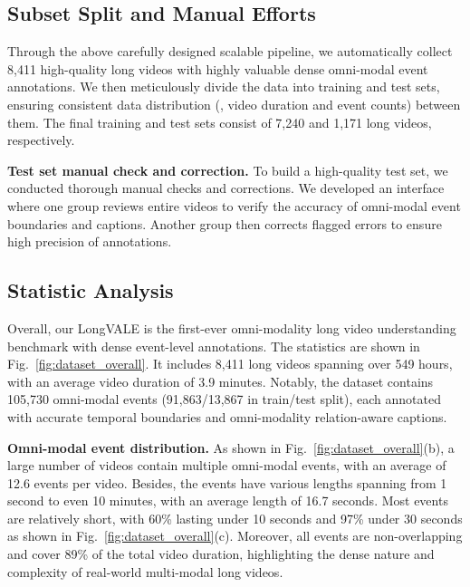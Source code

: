 \subsection{Subset Split and Manual Efforts}
\vspace{-1mm}
Through the above carefully designed scalable pipeline, we automatically collect 8,411 high-quality long videos with highly valuable dense omni-modal event annotations. 
We then meticulously divide the data into training and test sets, ensuring consistent data distribution (\eg, video duration and event counts) between them.
The final training and test sets consist of 7,240 and 1,171 long videos, respectively.

\noindent\textbf{Test set manual check and correction.}
To build a high-quality test set, we conducted thorough manual checks and corrections.
We developed an interface where one group reviews entire videos to verify the accuracy of omni-modal event boundaries and captions. Another group then corrects flagged errors to ensure high precision of annotations.



\subsection{Statistic Analysis}
\label{sec:3.5}
\vspace{-1mm}
Overall, our LongVALE is the first-ever omni-modality long video understanding benchmark with dense event-level annotations. The statistics are shown in Fig.~\ref{fig:dataset_overall}.
It includes 8,411 long videos spanning over 549 hours, with an average video duration of 3.9 minutes. 
Notably, the dataset contains 105,730 omni-modal events (91,863/13,867 in train/test split), each annotated with accurate temporal boundaries and omni-modality relation-aware captions.  

\noindent \textbf{Omni-modal event distribution.}
As shown in Fig.~\ref{fig:dataset_overall}(b), a large number of videos contain multiple omni-modal events, with an average of 12.6 events per video. 
Besides, the events have various lengths spanning from 1 second to even 10 minutes, with an average length of 16.7 seconds. 
Most events are relatively short, with 60\% lasting under 10 seconds and 97\% under 30 seconds as shown in Fig.~\ref{fig:dataset_overall}(c). 
Moreover, all events are non-overlapping and cover 89\% of the total video duration, highlighting the dense nature and complexity of real-world multi-modal long videos.

